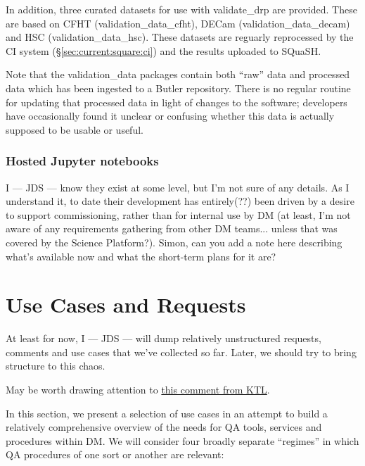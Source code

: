 \documentclass[DM,authoryear,toc,lsstdraft]{lsstdoc}
\begin{document}
In addition, three curated datasets for use with validate\_drp are provided.
These are based on CFHT (validation\_data\_cfht), DECam
(validation\_data\_decam) and HSC (validation\_data\_hsc). These datasets are
reguarly reprocessed by the CI system (\S\ref{sec:current:square:ci}) and the
results uploaded to SQuaSH.

Note that the validation\_data packages contain both ``raw'' data and
processed data which has been ingested to a Butler repository. There is no
regular routine for updating that processed data in light of changes to the
software; developers have occasionally found it unclear or confusing whether
this data is actually supposed to be usable or useful.

\subsubsection{Hosted Jupyter notebooks}
\label{sec:current:square:jupyter}

\begin{draftnote}
I --- JDS --- know they exist at some level, but I'm not sure of any details.
As I understand it, to date their development has entirely(??) been driven by
a desire to support commissioning, rather than for internal use by DM (at
least, I'm not aware of any requirements gathering from other DM teams...
unless that was covered by the Science Platform?). Simon, can you add a note
here describing what's available now and what the short-term plans for it are?
\end{draftnote}

\section{Use Cases and Requests}
\label{sec:use}

\begin{draftnote}
At least for now, I --- JDS --- will dump relatively unstructured requests,
comments and use cases that we've collected so far. Later, we should try to
bring structure to this chaos.

May be worth drawing attention to
\href{https://github.com/lsst-dm/dmtn-074/commit/06fa883ebeb12cf728dda14fa82e4c1f01fa5696#r27754730}{this
comment from KTL}.
\end{draftnote}

In this section, we present a selection of use cases in an attempt to build a
relatively comprehensive overview of the needs for QA tools, services and
procedures within DM. We will consider four broadly separate ``regimes'' in
which QA procedures of one sort or another are relevant:
\end{document}
